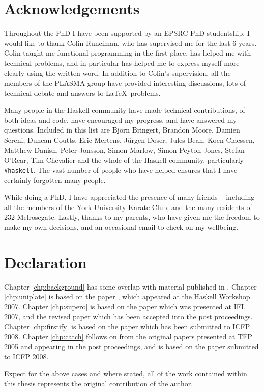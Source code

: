 \tableofcontents
\listoffigures
\listoftables

\chapter*{Acknowledgements}

Throughout the PhD I have been supported by an EPSRC PhD studentship. I would like to thank Colin Runciman, who has supervised me for the last 6 years. Colin taught me functional programming in the first place, has helped me with technical problems, and in particular has helped me to express myself more clearly using the written word. In addition to Colin's supervision, all the members of the PLASMA group have provided interesting discussions, lots of technical debate and answers to \LaTeX\ problems.

Many people in the Haskell community have made technical contributions, of both ideas and code, have encouraged my progress, and have answered my questions. Included in this list are Bj\"{o}rn Bringert, Brandon Moore, Damien Sereni, Duncan Coutts, Eric Mertens, J\"{u}rgen Doser, Jules Bean, Koen Claessen, Matthew Danish, Peter Jonsson, Simon Marlow, Simon Peyton Jones, Stefan O'Rear, Tim Chevalier and the whole of the Haskell community, particularly \verb"#haskell". The vast number of people who have helped ensures that I have certainly forgotten many people.

While doing a PhD, I have appreciated the presence of many friends -- including all the members of the York University Karate Club, and the many residents of 232 Melrosegate. Lastly, thanks to my parents, who have given me the freedom to make my own decisions, and an occasional email to check on my wellbeing.

\chapter*{Declaration}

Chapter \ref{chp:background} has some overlap with material published in \cite{me:yhc_core}. Chapter \ref{chp:uniplate} is based on the paper \cite{me:uniplate}, which appeared at the Haskell Workshop 2007. Chapter \ref{chp:supero} is based on the paper \cite{me:supero_ifl} which was presented at IFL 2007, and the revised paper \cite{me:supero} which has been accepted into the post proceedings. Chapter \ref{chp:firstify} is based on the paper \cite{me:firstify_icfp} which has been submitted to ICFP 2008. Chapter \ref{chp:catch} follows on from the original papers \cite{me:catch_tfp_original,me:catch_tfp} presented at TFP 2005 and appearing in the post proceedings, and is based on the paper \cite{me:catch_icfp} submitted to ICFP 2008.

Expect for the above cases and where stated, all of the work contained within this thesis represents the original contribution of the author.
